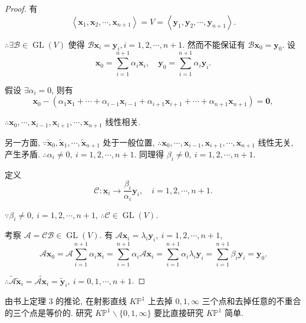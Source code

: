 \documentclass{ctexart}
\begin{document}
\begin{proof}
    有
    \[\left<\boldsymbol{x}_1,\boldsymbol{x}_2,\cdots,\boldsymbol{x}_{n+1}\right>=V=\left<\boldsymbol{y}_1,\boldsymbol{y}_2,\cdots,\boldsymbol{y}_{n+1}\right>.\]

    $\therefore\exists\mathcal{B}\in\operatorname{GL}(V)$ 使得 $\mathcal{B}\boldsymbol{x}_i=\boldsymbol{y}_i,i=1,2,\cdots,n+1$. 然而不能保证有 $\mathcal{B}\boldsymbol{x}_0=\boldsymbol{y}_0$. 设
    \[\boldsymbol{x}_0=\sum\limits_{i=1}^{n+1}\alpha_i\boldsymbol{x}_i,\quad\boldsymbol{y}_0=\sum\limits_{i=1}^{n+1}\alpha_i\boldsymbol{y}_i.\]

    假设 $\exists\alpha_i=0$, 则有
    \[\boldsymbol{x}_0-(\alpha_1\boldsymbol{x}_1+\cdots+\alpha_{i-1}\boldsymbol{x}_{i-1}+\alpha_{i+1}\boldsymbol{x}_{i+1}+\cdots+\alpha_{n+1}\boldsymbol{x}_{n+1})=\boldsymbol{0},\]

    $\therefore\boldsymbol{x}_0,\cdots,\boldsymbol{x}_{i-1},\boldsymbol{x}_{i+1},\cdots,\boldsymbol{x}_{n+1}$ 线性相关.
    
    另一方面, $\because\tilde{\boldsymbol{x}}_0,\tilde{\boldsymbol{x}}_1,\cdots,\tilde{\boldsymbol{x}}_{n+1}$ 处于一般位置, $\therefore\boldsymbol{x}_0,\cdots,\boldsymbol{x}_{i-1},\boldsymbol{x}_{i+1},\cdots,\boldsymbol{x}_{n+1}$ 线性无关, 产生矛盾. $\therefore\alpha_i\neq0,\ i=1,2,\cdots,n+1$. 同理得 $\beta_i\neq0,\ i=1,2,\cdots,n+1$.
    
    定义
    \[\mathcal{C}:\boldsymbol{x}_i\to\dfrac{\beta_i}{\alpha_i}\boldsymbol{y}_i,\quad i=1,2,\cdots,n+1.\]

    $\because\beta_i\neq0,\ i=1,2,\cdots,n+1$, $\therefore\mathcal{C}\in\operatorname{GL}(V)$.

    考察 $\mathcal{A}=\mathcal{CB}\in\operatorname{GL}(V)$. 有 $\mathcal{A}\boldsymbol{x}_i=\lambda_i\boldsymbol{y}_i,\ i=1,2,\cdots,n+1$,
    \[\mathcal{A}\boldsymbol{x}_0=\mathcal{A}\sum\limits_{i=1}^{n+1}\alpha_i\boldsymbol{x}_i=\sum\limits_{i=1}^{n+1}\alpha_i\mathcal{A}\boldsymbol{x}_i=\sum\limits_{i=1}^{n+1}\alpha_i\lambda_i\boldsymbol{y}_i=\sum\limits_{i=1}^{n+1}\beta_i\boldsymbol{y}_i=\boldsymbol{y}_0.\]

    $\therefore\widetilde{\mathcal{A}}\tilde{\boldsymbol{x}}_i=\widetilde{\mathcal{A}\boldsymbol{x}_i}=\tilde{\boldsymbol{y}}_i,\ i=0,1,\cdots,n+1$.
\end{proof}
由书上定理 3 的推论, 在射影直线 $K\mathbb{P}^1$ 上去掉 $0,1,\infty$ 三个点和去掉任意的不重合的三个点是等价的. 研究 $K\mathbb{P}^1\backslash\{0,1,\infty\}$ 要比直接研究 $K\mathbb{P}^1$ 简单.
\end{document}
